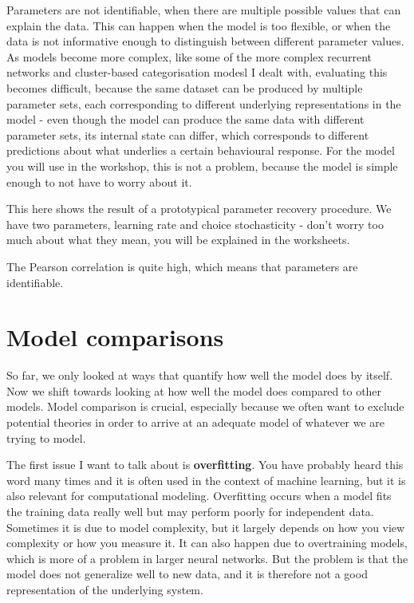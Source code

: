 \documentclass[12pt]{article}
\begin{document}
Parameters are not identifiable, when there are multiple possible values that can explain the data. This can happen when the model is too flexible, or when the data is not informative enough to distinguish between different parameter values. As models become more complex, like some of the more complex recurrent networks and cluster-based categorisation modesl I dealt with, evaluating this becomes difficult, because the same dataset can be produced by multiple parameter sets, each corresponding to different underlying representations in the model - even though the model can produce the same data with different parameter sets, its internal state can differ, which corresponds to different predictions about what underlies a certain behavioural response. For the model you will use in the workshop, this is not a problem, because the model is simple enough to not have to worry about it.

This here shows the result of a prototypical parameter recovery procedure. We have two parameters, learning rate and choice stochasticity - don't worry too much about what they mean, you will be explained in the worksheets.

The Pearson correlation is quite high, which means that parameters are identifiable.

\section{Model comparisons}

So far, we only looked at ways that quantify how well the model does by itself. Now we shift towards looking at how well the model does compared to other models. Model comparison is crucial, especially because we often want to exclude potential theories in order to arrive at an adequate model of whatever we are trying to model.

The first issue I want to talk about is \textbf{overfitting}. You have probably heard this word many times and it is often used in the context of machine learning, but it is also relevant for computational modeling. Overfitting occurs when a model fits the training data really well but may perform poorly for independent data. Sometimes it is due to model complexity, but it largely depends on how you view complexity or how you measure it. It can also happen due to overtraining models, which is more of a problem in larger neural networks. But the problem is that the model does not generalize well to new data, and it is therefore not a good representation of the underlying system.
\end{document}
